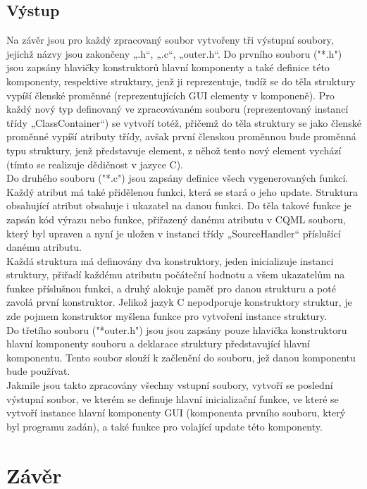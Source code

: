 \documentclass[report,11pt]{elsarticle}
\begin{document}
\subsection{\label{SEC:Intro}Výstup}
Na závěr jsou pro každý zpracovaný soubor vytvořeny tři výstupní soubory, jejichž názvy jsou zakončeny „.h“, „.c“, „outer.h“. 
Do prvního souboru ("*.h") jsou zapsány hlavičky konstruktorů hlavní komponenty a také definice této komponenty, respektive struktury, jenž ji reprezentuje, tudíž se do těla struktury vypíší členské proměnné (reprezentujících GUI elementy v komponeně). Pro každý nový typ definovaný ve zpracovávaném souboru (reprezentovaný instancí třídy „ClassContainer“) se vytvoří totéž, přičemž do těla struktury se jako členské proměnné vypíší atributy třídy, avšak první členskou proměnnou bude proměnná typu struktury, jenž představuje element, z něhož tento nový element vychází (tímto se realizuje dědičnost v jazyce C).\\
Do druhého souboru ("*.c") jsou zapsány definice všech vygenerovaných funkcí. Každý atribut má také přidělenou funkci, která se stará o jeho update. Struktura obsahující atribut obsahuje i ukazatel na danou funkci. Do těla takové funkce je zapsán kód výrazu nebo funkce, přiřazený danému atributu v CQML souboru, který byl upraven a nyní je uložen v instanci třídy „SourceHandler“ příslušící danému atributu.\\
Každá struktura má definovány dva konstruktory, jeden inicializuje instanci struktury, přiřadí každému atributu počáteční hodnotu a všem ukazatelům na funkce příslušnou funkci, a druhý alokuje paměť pro danou strukturu a poté zavolá první konstruktor. Jelikož jazyk C nepodporuje konstruktory struktur, je zde pojmem konstruktor myšlena funkce pro vytvoření instance struktury.\\
Do třetího souboru ("*outer.h") jsou jsou zapsány pouze hlavička konstruktoru hlavní komponenty souboru a deklarace struktury představující hlavní komponentu. Tento soubor slouží k začlenění do souboru, jež danou komponentu bude používat.\\
Jakmile jsou takto zpracovány všechny vstupní soubory, vytvoří se poslední výstupní soubor, ve kterém se definuje hlavní inicializační funkce, ve které se vytvoří instance hlavní komponenty GUI (komponenta prvního souboru, který byl programu zadán), a také funkce pro volající update této komponenty.\\


\section{\label{SEC:Intro}Závěr}
\end{document}
